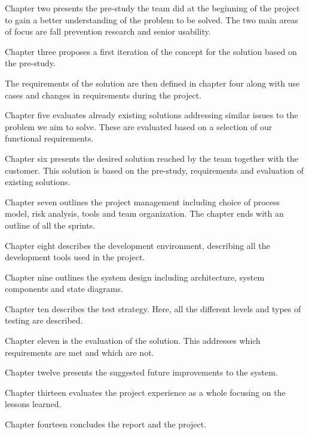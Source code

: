 Chapter two presents the pre-study the team did at the beginning of the project to gain a better understanding of the problem to be solved. The two main areas of focus are fall prevention research and senior usability.

Chapter three proposes a first iteration of the concept for the solution based on the pre-study.

The requirements of the solution are then defined in chapter four along with use cases and changes in requirements during the project.

Chapter five evaluates already existing solutions addressing similar issues to the problem we aim to solve. These are evaluated based on a selection of our functional requirements.

Chapter six presents the desired solution reached by the team together with the customer. This solution is based on the pre-study, requirements and evaluation of existing solutions.

Chapter seven outlines the project management including choice of process model, risk analysis, tools and team organization. The chapter ends with an outline of all the sprints.

Chapter eight describes the development environment, describing all the development tools used in the project.

Chapter nine outlines the system design including architecture, system components and state diagrams.

Chapter ten describes the test strategy. Here, all the different levels and types of testing are described.

Chapter eleven is the evaluation of the solution. This addresses which requirements are met and which are not.

Chapter twelve presents the suggested future improvements to the system.

Chapter thirteen evaluates the project experience as a whole focusing on the lessons learned.

Chapter fourteen concludes the report and the project. 
